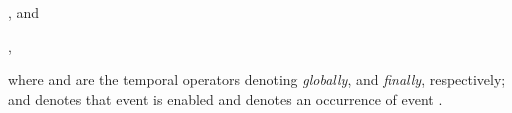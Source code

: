 \begin{center}
  , and

  ,
\end{center}
  where \mbox{} and \mbox{} are the
  temporal operators denoting \emph{globally}, and \emph{finally},
  respectively; and \mbox{} denotes that
  event \mbox{} is enabled and
  \mbox{\EventBInline{[e]}} denotes an occurrence of event
  \mbox{}.
